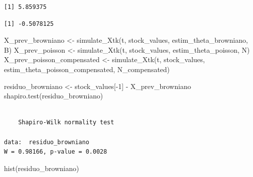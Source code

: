 \documentclass[
  letterpaper,
  DIV=11,
  numbers=noendperiod]{scrreprt}
\newenvironment{Shaded}{\begin{snugshade}}{\end{snugshade}}
\newcommand{\AttributeTok}[1]{\textcolor[rgb]{0.40,0.45,0.13}{#1}}
\newcommand{\DecValTok}[1]{\textcolor[rgb]{0.68,0.00,0.00}{#1}}
\newcommand{\DocumentationTok}[1]{\textcolor[rgb]{0.37,0.37,0.37}{\textit{#1}}}
\newcommand{\FunctionTok}[1]{\textcolor[rgb]{0.28,0.35,0.67}{#1}}
\newcommand{\NormalTok}[1]{\textcolor[rgb]{0.00,0.23,0.31}{#1}}
\newcommand{\OtherTok}[1]{\textcolor[rgb]{0.00,0.23,0.31}{#1}}
\newcommand{\SpecialCharTok}[1]{\textcolor[rgb]{0.37,0.37,0.37}{#1}}
\begin{document}
\begin{verbatim}
[1] 5.859375
\end{verbatim}

\begin{Shaded}
\end{Shaded}

\begin{verbatim}
[1] -0.5078125
\end{verbatim}

\begin{Shaded}
\begin{Highlighting}[]
\NormalTok{X\_prev\_browniano }\OtherTok{\textless{}{-}}
  \FunctionTok{simulate\_Xtk}\NormalTok{(t, stock\_values, estim\_theta\_browniano, B)}
\NormalTok{X\_prev\_poisson }\OtherTok{\textless{}{-}}
  \FunctionTok{simulate\_Xtk}\NormalTok{(t, stock\_values, estim\_theta\_poisson, N)}
\NormalTok{X\_prev\_poisson\_compensated }\OtherTok{\textless{}{-}}
  \FunctionTok{simulate\_Xtk}\NormalTok{(t, stock\_values, estim\_theta\_poisson\_compensated, N\_compensated)}

\NormalTok{residuo\_browniano }\OtherTok{\textless{}{-}}\NormalTok{ stock\_values[}\SpecialCharTok{{-}}\DecValTok{1}\NormalTok{] }\SpecialCharTok{{-}}\NormalTok{ X\_prev\_browniano}
\FunctionTok{shapiro.test}\NormalTok{(residuo\_browniano)}
\end{Highlighting}
\end{Shaded}

\begin{verbatim}

    Shapiro-Wilk normality test

data:  residuo_browniano
W = 0.98166, p-value = 0.0028
\end{verbatim}

\begin{Shaded}
\begin{Highlighting}[]
\FunctionTok{hist}\NormalTok{(residuo\_browniano)}
\end{Highlighting}
\end{Shaded}
\end{document}
